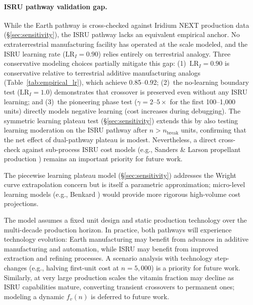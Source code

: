 \documentclass[preprint,12pt]{elsarticle}
\begin{document}
\paragraph{ISRU pathway validation gap.} While the Earth pathway is cross-checked against Iridium NEXT production data (\S\ref{sec:sensitivity}), the ISRU pathway lacks an equivalent empirical anchor. No extraterrestrial manufacturing facility has operated at the scale modeled, and the ISRU learning rate ($\mathrm{LR}_I = 0.90$) relies entirely on terrestrial analogy. Three conservative modeling choices partially mitigate this gap: (1)~$\mathrm{LR}_I = 0.90$ is conservative relative to terrestrial additive manufacturing analogs (Table~\ref{tab:empirical_lr}), which achieve 0.85--0.92; (2)~the no-learning boundary test ($\mathrm{LR}_I = 1.0$) demonstrates that crossover is preserved even without any ISRU learning; and (3)~the pioneering phase test ($\gamma = 2$--$5\times$ for the first 100--1{,}000 units) directly models negative learning (cost increases during debugging). The symmetric learning plateau test (\S\ref{sec:sensitivity}) extends this by also testing learning moderation on the ISRU pathway after $n > n_{\mathrm{break}}$ units, confirming that the net effect of dual-pathway plateau is modest. Nevertheless, a direct cross-check against sub-process ISRU cost models (e.g., Sanders \& Larson propellant production \cite{sanders2015}) remains an important priority for future work.

The piecewise learning plateau model (\S\ref{sec:sensitivity}) addresses the Wright curve extrapolation concern but is itself a parametric approximation; micro-level learning models (e.g., Benkard \cite{benkard2000}) would provide more rigorous high-volume cost projections.

The model assumes a fixed unit design and static production technology over the multi-decade production horizon. In practice, both pathways will experience technology evolution: Earth manufacturing may benefit from advances in additive manufacturing and automation, while ISRU may benefit from improved extraction and refining processes. A scenario analysis with technology step-changes (e.g., halving first-unit cost at $n = 5{,}000$) is a priority for future work. Similarly, at very large production scales the vitamin fraction may decline as ISRU capabilities mature, converting transient crossovers to permanent ones; modeling a dynamic $f_v(n)$ is deferred to future work.
\end{document}
